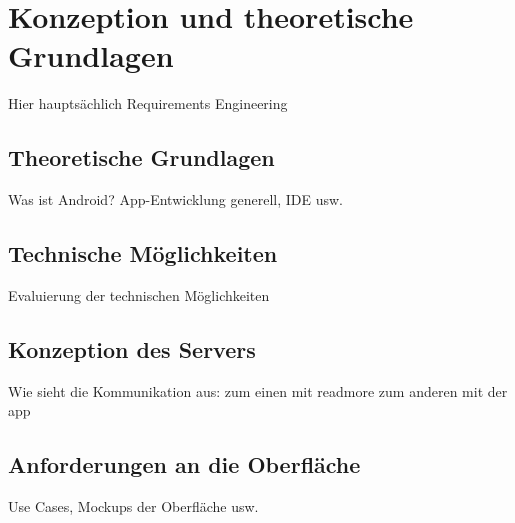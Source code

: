 \chapter{Konzeption und theoretische Grundlagen}
\label{cha:theoGrundlagen}
Hier hauptsächlich Requirements Engineering

\section{Theoretische Grundlagen}
Was ist Android?
App-Entwicklung generell, IDE usw.

\section{Technische Möglichkeiten}
Evaluierung der technischen Möglichkeiten

\section{Konzeption des Servers}
Wie sieht die Kommunikation aus: zum einen mit readmore zum anderen mit der app

\section{Anforderungen an die Oberfläche}
Use Cases, Mockups der Oberfläche usw.